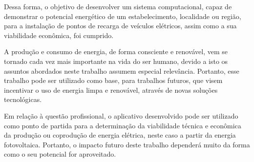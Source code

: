 Dessa forma, o objetivo de desenvolver um sistema computacional, capaz de demonstrar o potencial energético de um estabelecimento, localidade ou região, para a instalação de pontos de recarga de veículos elétricos, assim como a sua viabilidade econômica, foi cumprido.

A produção e consumo de energia, de forma consciente e renovável, vem se tornado cada vez mais importante na vida do ser humano, devido a isto os assuntos abordados neste trabalho assumem especial relevância. Portanto, esse trabalho pode ser utilizado como base, para trabalhos futuros, que visem incentivar o uso de energia limpa e renovável, através de novas soluções tecnológicas.

Em relação à questão profissional, o aplicativo desenvolvido pode ser utilizado como ponto de partida para a determinação da viabilidade técnica e econômica da produção ou coprodução de energia elétrica, neste caso a partir da energia fotovoltaica. Portanto, o impacto futuro deste trabalho dependerá muito da forma como o seu potencial for aproveitado.
